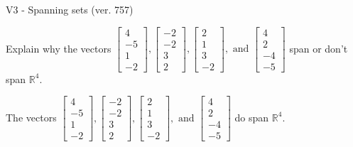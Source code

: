 \begin{exercise}
  \begin{exerciseTitle}V3 - Spanning sets (ver. 757)\end{exerciseTitle}
  \begin{exerciseStatement}
    Explain why the vectors \(\left[\begin{array}{r}
4 \\
-5 \\
1 \\
-2
\end{array}\right] , \left[\begin{array}{r}
-2 \\
-2 \\
3 \\
2
\end{array}\right] , \left[\begin{array}{r}
2 \\
1 \\
3 \\
-2
\end{array}\right] , \text{ and } \left[\begin{array}{r}
4 \\
2 \\
-4 \\
-5
\end{array}\right]\) span or don't span \(\mathbb{R}^4\). 
	


  \end{exerciseStatement}
  \begin{exerciseAnswer}
   The vectors \(\left[\begin{array}{r}
4 \\
-5 \\
1 \\
-2
\end{array}\right] , \left[\begin{array}{r}
-2 \\
-2 \\
3 \\
2
\end{array}\right] , \left[\begin{array}{r}
2 \\
1 \\
3 \\
-2
\end{array}\right] , \text{ and } \left[\begin{array}{r}
4 \\
2 \\
-4 \\
-5
\end{array}\right]\) 
  	 do  
	span \(\mathbb{R}^4\).
  


  \end{exerciseAnswer}
\end{exercise}